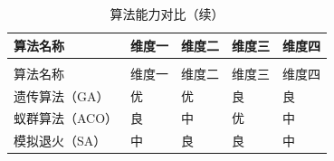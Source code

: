 \begin{longtable}{>{\centering\arraybackslash}p{}>{\centering\arraybackslash}p{}>{\centering\arraybackslash}p{}>{\centering\arraybackslash}p{}>{\centering\arraybackslash}p{}}
  \caption{算法能力对比}
  \label{tab:算法对比1} \\
  \toprule
  算法名称 & 维度一 & 维度二 & 维度三 & 维度四 \\
  \midrule
  \endfirsthead
  \caption{算法能力对比（续）} \\
  \toprule
  算法名称 & 维度一 & 维度二 & 维度三 & 维度四 \\
  \midrule
  \endhead
  \bottomrule
  \endfoot
  遗传算法（GA） & 优 & 优 & 良 & 良 \\
  蚁群算法（ACO） & 良 & 中 & 优 & 中 \\
  模拟退火（SA） & 中 & 良 & 良 & 中 \\
\end{longtable}
